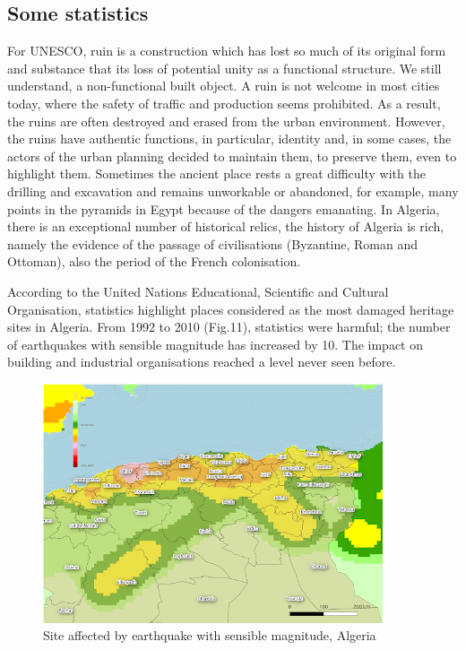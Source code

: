 \documentclass[Afour,sageh,times]{sagej}
\begin{document}
\subsection{Some statistics}
For UNESCO, ruin is a construction which has lost so much of its original form and substance that its loss of potential unity as a functional structure. We still understand, a non-functional built object.
A ruin is not welcome in most cities today, where the safety of traffic and production seems prohibited. As a result, the ruins are often destroyed and erased from the urban environment. However, the ruins have authentic functions, in particular, identity and, in some cases, the actors of the urban planning decided to maintain them, to preserve them, even to highlight them.
Sometimes the ancient place rests a great difficulty with the drilling and excavation and remains unworkable or abandoned, for example, many points in the pyramids in Egypt because of the dangers emanating.
In Algeria, there is an exceptional number of historical relics, the history of Algeria is rich, namely the evidence of the passage of civilisations (Byzantine, Roman and Ottoman), also the period of the French colonisation.

According to the United Nations Educational, Scientific and Cultural Organisation, statistics highlight places considered as the most damaged heritage sites in Algeria.
From 1992 to 2010 (Fig.11), statistics were harmful; the number of earthquakes with sensible magnitude has increased by 10. The impact on building and industrial organisations reached a level never seen before.

\begin{figure}
    \centering
    \includegraphics[scale=25]{EarthQuakeStat.png}
    \caption{Site affected by earthquake with sensible magnitude, Algeria}
    \label{fig:earthquake}
\end{figure}
\end{document}
